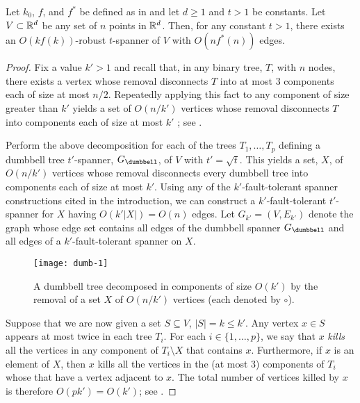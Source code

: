 \documentclass{patmorin}
\begin{document}
\begin{thm}
  Let $k_0$, $f$, and $f^*$ be defined as in  and let
  $d\ge 1$ and $t>1$ be constants.  Let $V\subset \mathbb{R}^d$ be any set of
  $n$ points in $\mathbb{R}^d$.  Then, for any constant $t>1$,  there exists an
  $O(kf(k))$-robust $t$-spanner of $V$ with $O(nf^*(n))$ edges.
\end{thm}

\begin{proof} 
  Fix a value $k'>1$ and recall that, in any binary tree, $T$, with $n$
  nodes, there exists a vertex whose removal disconnects $T$ into at most
  3 components each of size at most $n/2$.  Repeatedly applying this fact
  to any component of size greater than $k'$ yields a set of $O(n/k')$
  vertices whose removal disconnects $T$ into components each of size
  at most $k'$ \cite[Lemma~12.1.5]{smidxxx}; see .

  Perform the above decomposition for each of the trees $T_1,\ldots,T_p$
  defining a dumbbell tree $t'$-spanner, $G_\dumbbell$, of $V$ with
  $t'=\sqrt{t}$.  This yields a set, $X$, of $O(n/k')$ vertices
  whose removal disconnects every dumbbell tree into components
  each of size at most $k'$.  Using any of the $k'$-fault-tolerant
  spanner constructions cited in the introduction, we can construct a
  $k'$-fault-tolerant $t'$-spanner for $X$ having $O(k'|X|)=O(n)$ edges.
  Let $G_{k'}=(V,E_{k'})$ denote the graph whose edge set contains
  all edges of the dumbbell spanner $G_\dumbbell$ and all edges of a
  $k'$-fault-tolerant spanner on $X$.

  \begin{figure}
    \begin{center}
      \texttt{[image: dumb-1]}
    \end{center}
    \caption{A dumbbell tree decomposed in components of size $O(k')$
    by the removal of a set $X$ of $O(n/k')$ vertices (each denoted
    by $\circ$).}
  \end{figure}

  Suppose that we are now given a set $S\subseteq V$, $|S|=k\le k'$.
  Any vertex $x\in S$ appears at most twice in each tree $T_i$.  For each
  $i\in\{1,\ldots,p\}$, we say that $x$ \emph{kills} all the vertices
  in any component of $T_i\setminus X$ that contains $x$.  Furthermore,
  if $x$ is an element of $X$, then $x$ kills all the vertices in the (at
  most 3) components of $T_i$ whose that have a vertex adjacent to $x$.
  The total number of vertices killed by $x$ is therefore $O(pk')=O(k')$;
  see .


\end{proof}
\end{document}
